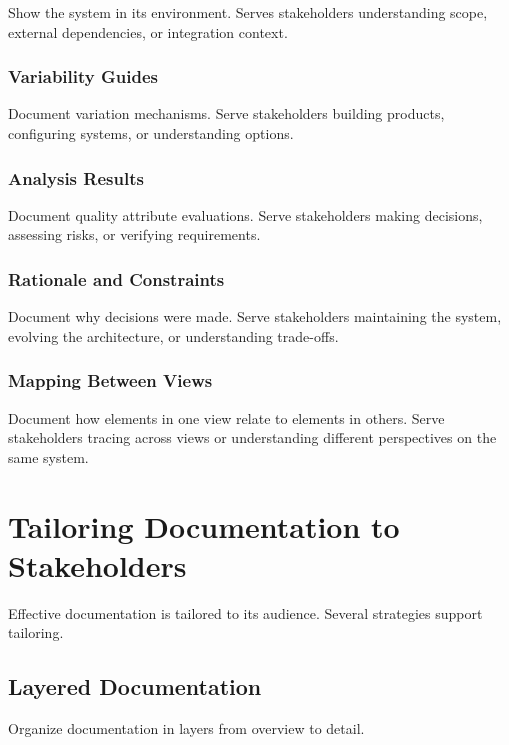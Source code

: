 \documentclass[11pt]{article}
\begin{document}
Show the system in its environment. Serves stakeholders understanding scope, external dependencies, or integration context.

\subsubsection{Variability Guides}

Document variation mechanisms. Serve stakeholders building products, configuring systems, or understanding options.

\subsubsection{Analysis Results}

Document quality attribute evaluations. Serve stakeholders making decisions, assessing risks, or verifying requirements.

\subsubsection{Rationale and Constraints}

Document why decisions were made. Serve stakeholders maintaining the system, evolving the architecture, or understanding trade-offs.

\subsubsection{Mapping Between Views}

Document how elements in one view relate to elements in others. Serve stakeholders tracing across views or understanding different perspectives on the same system.

\section{Tailoring Documentation to Stakeholders}

Effective documentation is tailored to its audience. Several strategies support tailoring.

\subsection{Layered Documentation}

Organize documentation in layers from overview to detail.
\end{document}
